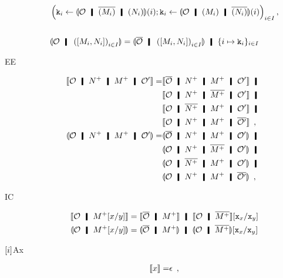 \begin{description}
\begin{align*}
       &\left(\p k_i\leftarrow
       \semoi{\hypert\hmid \overline{(M_i)}\hmid
       (N_i)}(i)
       ; \p k_i \leftarrow \semoi{\hypert\hmid {(M_i)}\hmid
       \overline{(N_i)}}(i)\right)_{i\in I},\\ \\
       &\semoi{ \hypert \hmid \left(\cotuple{M_i,N_i}\right)_{i\in I}
       }
       =
       \semoi{\overline{\hypert}\hmid \left(\cotuple{M_i,N_i}\right)_{i \in I}}
       \hmid \{i\mapsto \p k_i\}_{i\in I}
      \end{align*}
 \item[EE]
      \begin{align*}
       \semo{\hypert \hmid \m{N} \hmid \m{M} \hmid \hypert'}
       =&
       \semo{\overline{\hypert}\hmid \m{N}\hmid \m{M}\hmid \hypert'}
       \hmid \\
       &
       \semo{{\hypert}\hmid \m{N}\hmid \overline{\m{M}}\hmid \hypert'}
       \hmid \\
       &
       \semo{{\hypert}\hmid \overline{\m{N}}\hmid \m{M}\hmid \hypert'}
       \hmid \\
       &
       \semo{{\hypert}\hmid \m{N}\hmid \m{M}\hmid
       \overline{\hypert'}}\enspace,\\
       \semoi{\hypert \hmid \m{N} \hmid \m{M} \hmid \hypert'}
       =&
       \semoi{\overline{\hypert}\hmid \m{N}\hmid \m{M}\hmid \hypert'}
       \hmid \\
       &
       \semoi{{\hypert}\hmid \m{N}\hmid \overline{\m{M}}\hmid \hypert'}
       \hmid \\
       &
       \semoi{{\hypert}\hmid \overline{\m{N}}\hmid \m{M}\hmid \hypert'}
       \hmid \\
       &
       \semoi{{\hypert}\hmid \m{N}\hmid \m{M}\hmid
       \overline{\hypert'}}\enspace,
      \end{align*}
 \item[IC]
      \begin{align*}
       \semo{\hypert\hmid \m{M}[x/y]}&=
       \semo{\overline{\hypert}\hmid \m{M}} \hmid
       \semo{{\hypert}\hmid \overline{\m{M}}}[\p x_x/ \p x_y]\\
       \semoi{\hypert\hmid \m{M}[x/y]}&=
       \semoi{\overline{\hypert}\hmid \m{M}} \hmid
       \semoi{{\hypert}\hmid \overline{\m{M}}}[\p x_x/ \p x_y]
      \end{align*}
 \item[$\lbrack {i}\rbrack$Ax]
      \begin{align*}
       \semo{x}=& \epsilon \enspace,\\

\end{align*}
\end{description}
